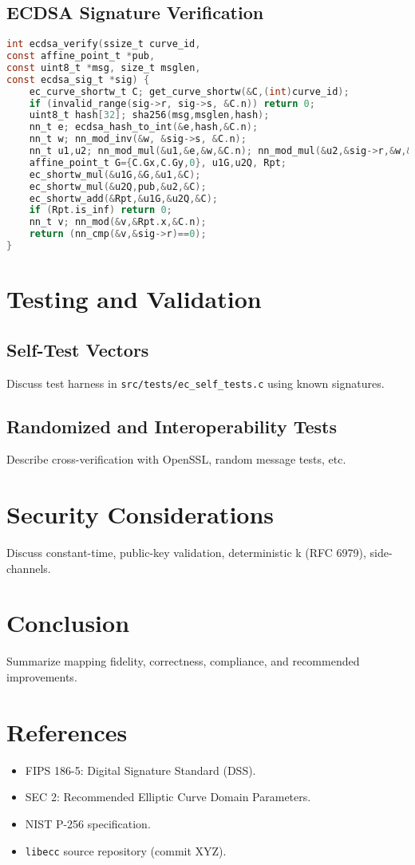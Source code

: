 \documentclass[12pt,a4paper]{article}
\begin{document}
\subsection{ECDSA Signature Verification}
\begin{lstlisting}[language=C]
int ecdsa_verify(ssize_t curve_id,
const affine_point_t *pub,
const uint8_t *msg, size_t msglen,
const ecdsa_sig_t *sig) {
	ec_curve_shortw_t C; get_curve_shortw(&C,(int)curve_id);
	if (invalid_range(sig->r, sig->s, &C.n)) return 0;
	uint8_t hash[32]; sha256(msg,msglen,hash);
	nn_t e; ecdsa_hash_to_int(&e,hash,&C.n);
	nn_t w; nn_mod_inv(&w, &sig->s, &C.n);
	nn_t u1,u2; nn_mod_mul(&u1,&e,&w,&C.n); nn_mod_mul(&u2,&sig->r,&w,&C.n);
	affine_point_t G={C.Gx,C.Gy,0}, u1G,u2Q, Rpt;
	ec_shortw_mul(&u1G,&G,&u1,&C);
	ec_shortw_mul(&u2Q,pub,&u2,&C);
	ec_shortw_add(&Rpt,&u1G,&u2Q,&C);
	if (Rpt.is_inf) return 0;
	nn_t v; nn_mod(&v,&Rpt.x,&C.n);
	return (nn_cmp(&v,&sig->r)==0);
}
\end{lstlisting}

\section{Testing and Validation}
\subsection{Self-Test Vectors}
Discuss test harness in \texttt{src/tests/ec\_self\_tests.c} using known signatures.

\subsection{Randomized and Interoperability Tests}
Describe cross-verification with OpenSSL, random message tests, etc.

\section{Security Considerations}
Discuss constant-time, public-key validation, deterministic k (RFC 6979), side-channels.

\section{Conclusion}
Summarize mapping fidelity, correctness, compliance, and recommended improvements.

\section*{References}
\begin{itemize}
	\item FIPS 186-5: Digital Signature Standard (DSS).
	\item SEC 2: Recommended Elliptic Curve Domain Parameters.
	\item NIST P-256 specification.
	\item \texttt{libecc} source repository (commit XYZ).
\end{itemize}
\end{document}

